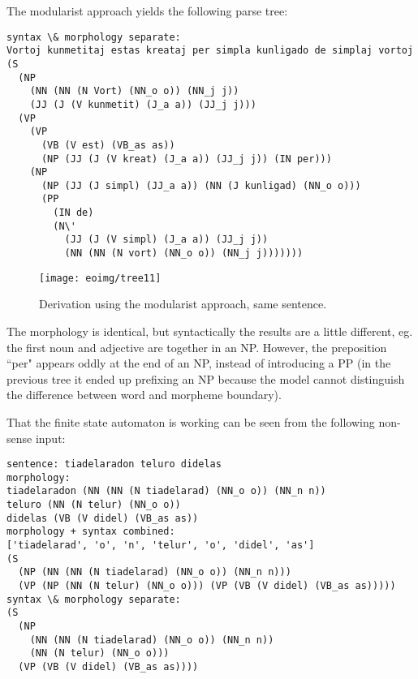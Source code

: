 \documentclass[10pt,a4paper]{article}
\begin{document}
The modularist approach yields the following parse tree:

\begin{verbatim}
syntax \& morphology separate:
Vortoj kunmetitaj estas kreataj per simpla kunligado de simplaj vortoj 
(S
  (NP
    (NN (NN (N Vort) (NN_o o)) (NN_j j))
    (JJ (J (V kunmetit) (J_a a)) (JJ_j j)))
  (VP
    (VP
      (VB (V est) (VB_as as))
      (NP (JJ (J (V kreat) (J_a a)) (JJ_j j)) (IN per)))
    (NP
      (NP (JJ (J simpl) (JJ_a a)) (NN (J kunligad) (NN_o o)))
      (PP
        (IN de)
        (N\'
          (JJ (J (V simpl) (J_a a)) (JJ_j j))
          (NN (NN (N vort) (NN_o o)) (NN_j j)))))))
\end{verbatim}

\begin{figure}
\texttt{[image: eoimg/tree11]}
\caption{Derivation using the modularist approach, same sentence.}
\label{s4}
\end{figure}

The morphology is identical, but syntactically the results are a little
different, eg. the first noun and adjective are together in an NP. However,
the preposition ``per" appears oddly at the end of an NP, instead of
introducing a PP (in the previous tree it ended up prefixing an NP because the
model cannot distinguish the difference between word and morpheme boundary).

That the finite state automaton is working can be seen from
the following non-sense input:

\begin{verbatim}
sentence: tiadelaradon teluro didelas
morphology:
tiadelaradon (NN (NN (N tiadelarad) (NN_o o)) (NN_n n))
teluro (NN (N telur) (NN_o o))
didelas (VB (V didel) (VB_as as))
morphology + syntax combined:
['tiadelarad', 'o', 'n', 'telur', 'o', 'didel', 'as']
(S
  (NP (NN (NN (N tiadelarad) (NN_o o)) (NN_n n)))
  (VP (NP (NN (N telur) (NN_o o))) (VP (VB (V didel) (VB_as as)))))
syntax \& morphology separate:
(S
  (NP
    (NN (NN (N tiadelarad) (NN_o o)) (NN_n n))
    (NN (N telur) (NN_o o)))
  (VP (VB (V didel) (VB_as as))))
\end{verbatim}
\end{document}
